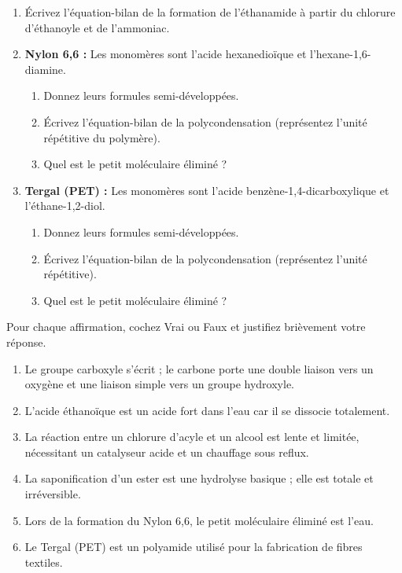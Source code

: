 \documentclass[11pt]{article}
\begin{document}
\begin{exercice}
\begin{enumerate}
    \item Écrivez l'équation-bilan de la formation de l'éthanamide à partir du chlorure d'éthanoyle et de l'ammoniac.
    \item \textbf{Nylon 6,6 :} Les monomères sont l'acide hexanedioïque et l'hexane-1,6-diamine.
    \begin{enumerate}
        \item Donnez leurs formules semi-développées.
        \item Écrivez l'équation-bilan de la polycondensation (représentez l'unité répétitive du polymère).
        \item Quel est le petit moléculaire éliminé ?
    \end{enumerate}
    \item \textbf{Tergal (PET) :} Les monomères sont l'acide benzène-1,4-dicarboxylique et l'éthane-1,2-diol.
    \begin{enumerate}
        \item Donnez leurs formules semi-développées.
        \item Écrivez l'équation-bilan de la polycondensation (représentez l'unité répétitive).
        \item Quel est le petit moléculaire éliminé ?
    \end{enumerate}
\end{enumerate}
\end{exercice}

\begin{exercice}
Pour chaque affirmation, cochez Vrai ou Faux et justifiez brièvement votre réponse.
\begin{enumerate}
    \item Le groupe carboxyle s'écrit  ; le carbone porte une double liaison vers un oxygène et une liaison simple vers un groupe hydroxyle.
    \item L'acide éthanoïque est un acide fort dans l'eau car il se dissocie totalement.
    \item La réaction entre un chlorure d'acyle et un alcool est lente et limitée, nécessitant un catalyseur acide et un chauffage sous reflux.
    \item La saponification d'un ester est une hydrolyse basique ; elle est totale et irréversible.
    \item Lors de la formation du Nylon 6,6, le petit moléculaire éliminé est l'eau.
    \item Le Tergal (PET) est un polyamide utilisé pour la fabrication de fibres textiles.
\end{enumerate}
\end{exercice}
\end{document}
